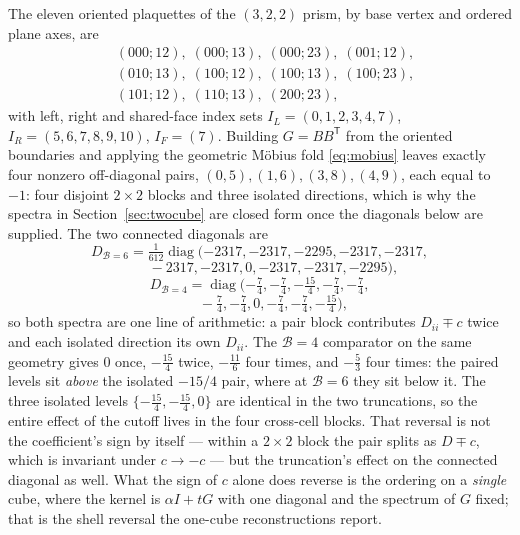 \documentclass[11pt]{article}
\theoremstyle{plain}
\theoremstyle{definition}
\theoremstyle{remark}
\newcommand{\chk}[1]{}
\begin{document}
The eleven oriented plaquettes of the $(3,2,2)$ prism, by base vertex and
ordered plane axes, are
\[
\begin{aligned}
&(000;12),\;(000;13),\;(000;23),\;(001;12),\\
&(010;13),\;(100;12),\;(100;13),\;(100;23),\\
&(101;12),\;(110;13),\;(200;23),
\end{aligned}
\]
with left, right and shared-face index sets
$I_L=(0,1,2,3,4,7)$, $I_R=(5,6,7,8,9,10)$, $I_F=(7)$. Building $G=BB^{\mathsf
T}$ from the oriented boundaries and applying the geometric M\"obius fold
\eqref{eq:mobius} leaves exactly four nonzero off-diagonal pairs,
$(0,5),(1,6),(3,8),(4,9)$, each equal to $-1$: four disjoint $2\times2$ blocks
and three isolated directions, which is why the spectra in
Section~\ref{sec:twocube} are closed form once the diagonals below are
supplied. The two connected diagonals are
\[
  D_{\mathcal B=6}=\tfrac1{612}\operatorname{diag}
  (-2317,-2317,-2295,-2317,-2317,
\]
\[
  \qquad -2317,-2317,0,-2317,-2317,-2295),
\]
\[
  D_{\mathcal B=4}=\operatorname{diag}
  (-\tfrac74,-\tfrac74,-\tfrac{15}4,-\tfrac74,-\tfrac74,
\]
\[
  \qquad -\tfrac74,-\tfrac74,0,-\tfrac74,-\tfrac74,-\tfrac{15}4),
\]
so both spectra are one line of arithmetic: a pair block contributes
$D_{ii}\mp c$ twice and each isolated direction its own $D_{ii}$. The $\mathcal B=4$
comparator on the same geometry gives $0$ once, $-\tfrac{15}4$ twice,
$-\tfrac{11}6$ four times, and $-\tfrac53$ four times:
the paired levels sit \emph{above} the isolated $-15/4$ pair, where at $\mathcal B=6$
they sit below it. The three isolated levels $\{-\tfrac{15}4,-\tfrac{15}4,0\}$
are identical in the two truncations, so the entire effect of the cutoff lives
in the four cross-cell blocks. That reversal is not the coefficient's sign by itself --- within a
$2\times2$ block the pair splits as $D\mp c$, which is invariant under
$c\to-c$ --- but the truncation's effect on the connected diagonal as well.
What the sign of $c$ alone does reverse is the ordering on a \emph{single}
cube, where the kernel is $\alpha I+tG$ with one diagonal and the spectrum of
$G$ fixed; that is the shell reversal the one-cube reconstructions report.
\chk{the B=4 comparator on the same geometry gives -1/12 with the reversed spectrum}
\end{document}
